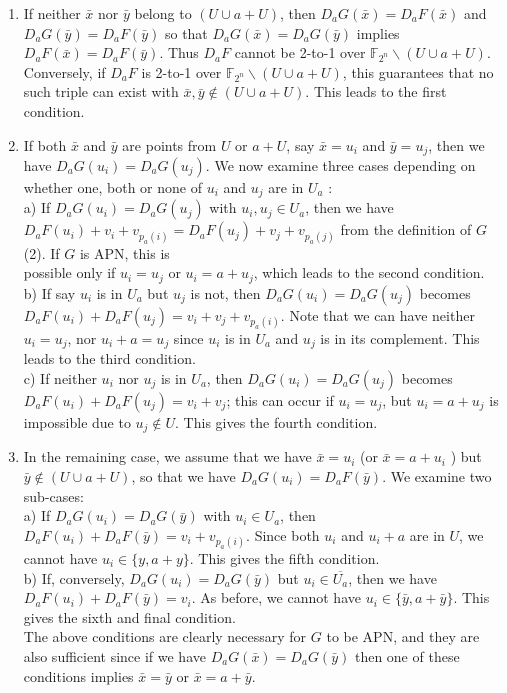 \documentclass[10pt]{article}
\begin{document}
\begin{enumerate}
  \item If neither $\bar{x}$ nor $\bar{y}$ belong to $(U \cup a+U)$, then $D_{a} G(\bar{x})= D_{a} F(\bar{x})$ and $D_{a} G(\bar{y})=D_{a} F(\bar{y})$ so that $D_{a} G(\bar{x})= D_{a} G(\bar{y})$ implies $D_{a} F(\bar{x})=D_{a} F(\bar{y})$. Thus $D_{a} F$ cannot be 2-to-1 over $\mathbb{F}_{2^{n}} \backslash(U \cup a+U)$. Conversely, if $D_{a} F$ is 2-to-1 over $\mathbb{F}_{2^{n}} \backslash(U \cup a+U)$, this guarantees that no such triple can exist with $\bar{x}, \bar{y} \notin(U \cup a+U)$. This leads to the first condition.
  \item If both $\bar{x}$ and $\bar{y}$ are points from $U$ or $a+U$, say $\bar{x}=u_{i}$ and $\bar{y}=u_{j}$, then we have $D_{a} G\left(u_{i}\right)=D_{a} G\left(u_{j}\right)$. We now examine three cases depending on whether one, both or none of $u_{i}$ and $u_{j}$ are in $U_{a}$ :\\
a) If $D_{a} G\left(u_{i}\right)=D_{a} G\left(u_{j}\right)$ with $u_{i}, u_{j} \in U_{a}$, then we have $D_{a} F\left(u_{i}\right)+v_{i}+v_{p_{a}(i)}=D_{a} F\left(u_{j}\right)+v_{j}+v_{p_{a}(j)}$ from the definition of $G$ (2). If $G$ is APN, this is\\
possible only if $u_{i}=u_{j}$ or $u_{i}=a+u_{j}$, which leads to the second condition.\\
b) If say $u_{i}$ is in $U_{a}$ but $u_{j}$ is not, then $D_{a} G\left(u_{i}\right)= D_{a} G\left(u_{j}\right)$ becomes $D_{a} F\left(u_{i}\right)+D_{a} F\left(u_{j}\right)=v_{i}+v_{j}+ v_{p_{a}(i)}$. Note that we can have neither $u_{i}=u_{j}$, nor $u_{i}+ a=u_{j}$ since $u_{i}$ is in $U_{a}$ and $u_{j}$ is in its complement. This leads to the third condition.\\
c) If neither $u_{i}$ nor $u_{j}$ is in $U_{a}$, then $D_{a} G\left(u_{i}\right)= D_{a} G\left(u_{j}\right)$ becomes $D_{a} F\left(u_{i}\right)+D_{a} F\left(u_{j}\right)=v_{i}+v_{j}$; this can occur if $u_{i}=u_{j}$, but $u_{i}=a+u_{j}$ is impossible due to $u_{j} \notin U$. This gives the fourth condition.
  \item In the remaining case, we assume that we have $\bar{x}=u_{i}$ (or $\bar{x}=a+u_{i}$ ) but $\bar{y} \notin(U \cup a+U)$, so that we have $D_{a} G\left(u_{i}\right)=D_{a} F(\bar{y})$. We examine two sub-cases:\\
a) If $D_{a} G\left(u_{i}\right)=D_{a} G(\bar{y})$ with $u_{i} \in U_{a}$, then $D_{a} F\left(u_{i}\right)+ D_{a} F(\bar{y})=v_{i}+v_{p_{a}(i)}$. Since both $u_{i}$ and $u_{i}+a$ are in $U$, we cannot have $u_{i} \in\{y, a+y\}$. This gives the fifth condition.\\
b) If, conversely, $D_{a} G\left(u_{i}\right)=D_{a} G(\bar{y})$ but $u_{i} \in \overline{U_{a}}$, then we have $D_{a} F\left(u_{i}\right)+D_{a} F(\bar{y})=v_{i}$. As before, we cannot have $u_{i} \in\{\bar{y}, a+\bar{y}\}$. This gives the sixth and final condition.\\
The above conditions are clearly necessary for $G$ to be APN, and they are also sufficient since if we have $D_{a} G(\bar{x})= D_{a} G(\bar{y})$ then one of these conditions implies $\bar{x}=\bar{y}$ or $\bar{x}=a+\bar{y}$.
\end{enumerate}
\end{document}
